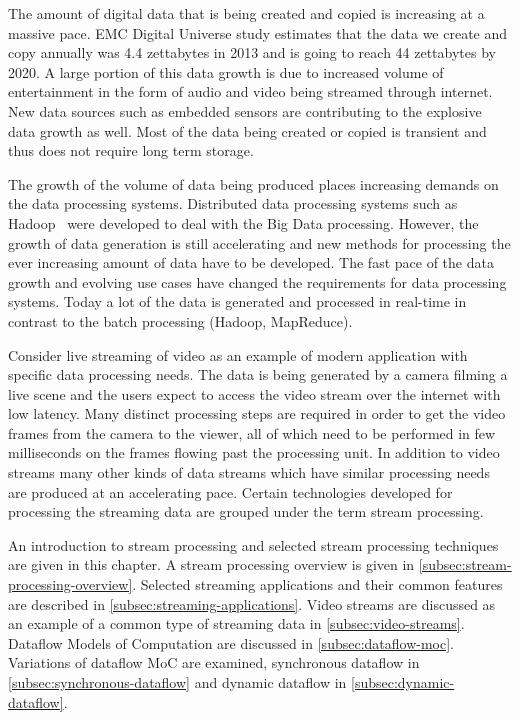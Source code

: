 
The amount of digital data that is being created and copied is increasing at a massive pace. EMC Digital Universe study \cite{turner2014digital} estimates that the data we create and copy annually was 4.4 zettabytes in 2013 and is going to reach 44 zettabytes by 2020. A large portion of this data growth is due to increased volume of entertainment in the form of audio and video being streamed through internet. New data sources such as embedded sensors are contributing to the explosive data growth as well. Most of the data being created or copied is transient and thus does not require long term storage.~\cite{turner2014digital}

The growth of the volume of data being produced places increasing demands on the data processing systems. Distributed data processing systems such as Hadoop~\cite{white2012hadoop} were developed to deal with the Big Data processing. However, the growth of data generation is still accelerating and new methods for processing the ever increasing amount of data have to be developed. The fast pace of the data growth and evolving use cases have changed the requirements for data processing systems. Today a lot of the data is generated and processed in real-time in contrast to the batch processing (Hadoop, MapReduce).

Consider live streaming of video as an example of modern application with specific data processing needs. The data is being generated by a camera filming a live scene and the users expect to access the video stream over the internet with low latency. Many distinct processing steps are required in order to get the video frames from the camera to the viewer, all of which need to be performed in few milliseconds on the frames flowing past the processing unit. In addition to video streams many other kinds of data streams which have similar processing needs are produced at an accelerating pace. Certain technologies developed for processing the streaming data are grouped under the term stream processing.

An introduction to stream processing and selected stream processing techniques are given in this chapter. A stream processing overview is given in \ref{subsec:stream-processing-overview}. Selected streaming applications and their common features are described in \ref{subsec:streaming-applications}. Video streams are discussed as an example of a common type of streaming data in \ref{subsec:video-streams}. Dataflow Models of Computation are discussed in \ref{subsec:dataflow-moc}. Variations of dataflow MoC are examined, synchronous dataflow in \ref{subsec:synchronous-dataflow} and dynamic dataflow in \ref{subsec:dynamic-dataflow}.
